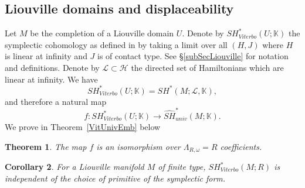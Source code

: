 \documentclass[11pt]{amsart}
\newcommand{\K}{\mathbb{K}}
\newtheorem{tm}{Theorem}[section]
\newtheorem{cy}[tm]{Corollary}
\theoremstyle{definition}
\theoremstyle{remark}
\begin{document}
\subsection{Liouville domains and displaceability}\label{subsecLiouIntro}

Let $M$ be the completion of a Liouville domain $U$. Denote by $SH^*_{Viterbo}(U;\K)$ the symplectic cohomology as defined in \cite{Viterbo99} by taking a limit over all $(H,J)$ where $H$ is linear at infinity and $J$ is of contact type.  See \S\ref{subSecLiouville} for notation and definitions. Denote by $\mathcal{L}\subset\mathcal{H}$ the directed set of Hamiltonians which are linear at infinity. We have
\[
SH^*_{Viterbo}(U;\K)=SH^*(M;\mathcal{L},\K),
\]
and therefore a natural map
\[
f:SH^*_{Viterbo}(U;\K)\to \widehat{SH}^*_{univ}(M;\K).
\]
We prove in Theorem~\ref{VitUnivEmb} below
\begin{tm}\label{tmVitrUniv}
The map $f$ is an isomorphism over $\Lambda_{R,\omega}=R$ coefficients.
\end{tm}
\begin{cy}
For a Liouville manifold $M$ of finite type, $SH_{Viterbo}^*(M;R)$ is independent of the choice of primitive of the symplectic form.
\end{cy}
\end{document}
